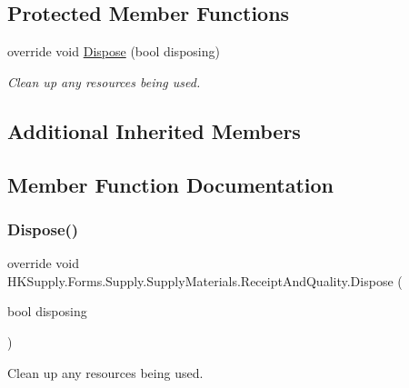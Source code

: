 \subsection*{Protected Member Functions}
\begin{DoxyCompactItemize}
\item 
override void \mbox{\hyperlink{class_h_k_supply_1_1_forms_1_1_supply_1_1_supply_materials_1_1_receipt_and_quality_a23307e30e1325b6e3d7541e84c2942e0}{Dispose}} (bool disposing)
\begin{DoxyCompactList}\small\item\em Clean up any resources being used. \end{DoxyCompactList}\end{DoxyCompactItemize}
\subsection*{Additional Inherited Members}


\subsection{Member Function Documentation}
\mbox{\label{class_h_k_supply_1_1_forms_1_1_supply_1_1_supply_materials_1_1_receipt_and_quality_a23307e30e1325b6e3d7541e84c2942e0}} 
\subsubsection{\texorpdfstring{Dispose()}{Dispose()}}
{\footnotesize\ttfamily override void H\+K\+Supply.\+Forms.\+Supply.\+Supply\+Materials.\+Receipt\+And\+Quality.\+Dispose (\begin{DoxyParamCaption}\item[{bool}]{disposing }\end{DoxyParamCaption})\hspace{0.3cm}{\ttfamily [protected]}}



Clean up any resources being used. 



